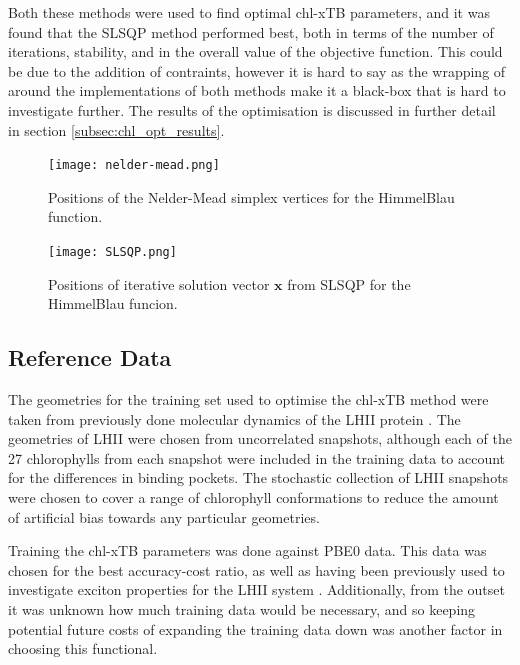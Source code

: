 Both these methods were used to find optimal chl-xTB parameters, and it was found 
that the SLSQP method performed best, both in terms of the number of iterations,
stability, and in the overall value of the objective function. This could be due 
to the addition of contraints, however it is hard to say as the wrapping of 
around the implementations of both methods make it a black-box that is hard to 
investigate further. The results of the optimisation is discussed in further detail
in section \ref{subsec:chl_opt_results}.

\begin{figure}
    \texttt{[image: nelder-mead.png]}
    \caption{Positions of the Nelder-Mead simplex vertices for the HimmelBlau function.}
    \label{fig:nelder_mead}
\end{figure}

\begin{figure}
    \texttt{[image: SLSQP.png]}
    \caption{Positions of iterative solution vector $\mathbf{x}$ from SLSQP for
    the HimmelBlau funcion.}
    \label{fig:slsqp}
\end{figure}

\subsection{Reference Data}
\label{subsec:ref_data}
The geometries for the training set used to optimise the chl-xTB method were taken
from previously done molecular dynamics of the LHII protein \cite{Stross2016}. 
The geometries of LHII were chosen from uncorrelated snapshots, although each of
the 27 chlorophylls from each snapshot were included in the training data to account
for the differences in binding pockets. The stochastic collection of LHII snapshots
were chosen to cover a range of chlorophyll conformations to reduce the amount of
artificial bias towards any particular geometries.

Training the chl-xTB parameters was done against PBE0 data. This data was chosen
for the best accuracy-cost ratio, as well as having been previously used to investigate
exciton properties for the LHII system \cite{Stross2016}. Additionally, from the
outset it was unknown how much training data would be necessary, and so keeping 
potential future costs of expanding the training data down was another factor in 
choosing this functional.

